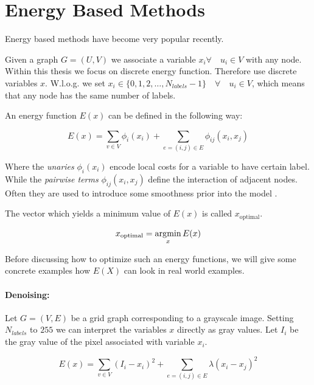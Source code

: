 \section{Energy Based Methods}\label{sec:energy_based_methods}

Energy based methods have become very popular recently.

Given a graph $G = (U,V)$ we 
associate  a variable $ x_i \forall \quad u_i \in V$ with any node.
Within this thesis we focus on discrete energy function.
Therefore use discrete variables $x$.
W.l.o.g. we set  $ x_i   \in \{ 0,1,2,\ldots, N_{labels}-1 \} \quad \forall \quad u_i \in V$,
which means that any node has the same number of labels.

An energy function $E(x)$ can be  defined  in the following way:

\begin{equation} \label{eq:gm_energy}
E(x) = \sum_{v \in V} \phi_i(x_i) + \sum_{e=(i,j) \in E }\phi_{ij}(x_i,x_j) 
\end{equation}

Where the \emph{unaries} $\phi_i(x_i)$ encode local costs
for a variable to have certain label.
While the \emph{pairwise terms} $\phi_{ij}(x_i,x_j) $ define the interaction of adjacent nodes.
Often they are used to introduce some smoothness prior
into the model \citep{WHOM_TO_CITE_HERE} .


The vector which yields a minimum value of $E(x)$
is called $x_{\text{optimal}}$.

\begin{equation} \label{eq:gm_argmin}
x_{\text{optimal}} = \operatorname*{\arg\!\min}_{x}  E(x)
\end{equation}


Before discussing how to optimize such an energy functions,
we will give some concrete examples how $E(X)$ 
can look in real world examples.

\paragraph{Denoising:}


Let $G=(V,E)$ be a grid graph corresponding to
a grayscale image.
Setting $N_{labels}$ to $255$ we can interpret  the variables $x$ directly as
gray values.
Let $I_i$ be the gray value of the pixel associated with variable $x_i$.

\begin{equation} \label{eq:gm_ef_dension}
E(x) = \sum_{v \in V}  (I_i - x_i)^2 + \sum_{e=(i,j) \in E } \lambda (x_i-x_j)^2
\end{equation}

